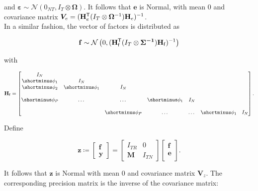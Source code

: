\documentclass[notitlepage,a4paper,12pt]{article}
\newcommand{\transpose}[1]{{#1}^{\sf{T}}}
\begin{document}
\noindent and $\boldsymbol{\varepsilon} \sim \mathcal{N}(0_{NT}, I_T \otimes \boldsymbol{\Omega})$. It follows that $\mathbf{e}$ is Normal, with mean $0$ and covariance matrix $\bm{V}_{e} = (\transpose{\mathbf{H}}_{e} (I_T \otimes \boldsymbol{\Omega}^{-1}) \mathbf{H}_e)^{-1}$. \\

In a similar fashion, the vector of factors is distributed as 

$$
\mathbf{f} \sim \mathcal{N}\left(0, (\transpose{\mathbf{H}}_{\sf{f}} (I_T \otimes \boldsymbol{\Sigma^{-1}}) \mathbf{H}_{\sf{f}})^{-1}\right)
$$

with 

$$
\mathbf{H}_{\sf{f}}
=
\begin{bmatrix}
    I_N &  \\
    \shortminus \phi_1 & I_N &  \\
    \shortminus \phi_2 & \shortminus \phi_1 & I_N &  \\
     &  &  &  &  & \\
    \shortminus \phi_P & \dots & \dots & \shortminus \phi_1 & I_N \\
     &  &  &  &  & \\
    & & \shortminus \phi_P & \dots & \dots & \shortminus \phi_1 & I_N
\end{bmatrix}.
$$

Define 

\begin{equation}
    \mathbf{z} 
    \coloneqq 
    \begin{bmatrix}
        \mathbf{f} \\
        \mathbf{y}
    \end{bmatrix} 
    = 
    \begin{bmatrix}
        I_{TR} & 0 \\
        \mathbf{M} & I_{TN} 
    \end{bmatrix}
    \begin{bmatrix}
        \mathbf{f}\\
        \mathbf{e}\\
    \end{bmatrix}.
\end{equation}

It follows that $\mathbf{z}$ is Normal with mean 0 and covariance matrix $\mathbf{V}_{\!z}$. The corresponding precision matrix is the inverse of the covariance matrix: 
\end{document}
